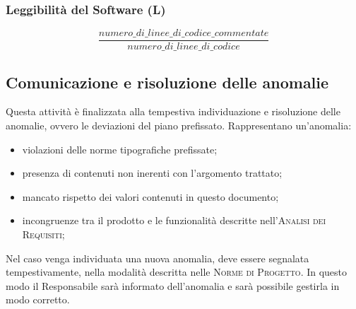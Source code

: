 \subsubsection{Leggibilità del Software (L)}
\[\frac{numero\_di\_linee\_di\_codice\_commentate}{numero\_di\_linee\_di\_codice}\]

\subsection{Comunicazione e risoluzione delle anomalie}

Questa attività è finalizzata alla tempestiva individuazione e risoluzione delle anomalie, ovvero le deviazioni del piano prefissato. Rappresentano un'anomalia:
\begin{itemize}
    \item violazioni delle norme tipografiche prefissate;
    \item presenza di contenuti non inerenti con l'argomento trattato;
    \item mancato rispetto dei valori contenuti in questo documento;
    \item incongruenze tra il prodotto e le funzionalità descritte nell'\textsc{Analisi dei Requisiti};
\end{itemize}
Nel caso venga individuata una nuova anomalia, deve essere segnalata tempestivamente, nella modalità descritta nelle \textsc{Norme di Progetto}. In questo modo il Responsabile sarà informato dell'anomalia e sarà possibile gestirla in modo corretto.
